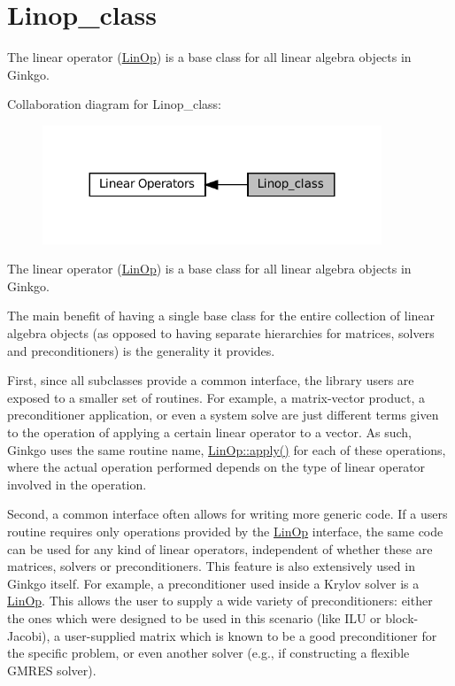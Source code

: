 \hypertarget{group__linop__class}{}\section{Linop\+\_\+class}
\label{group__linop__class}


The linear operator (\hyperlink{classgko_1_1LinOp}{Lin\+Op}) is a base class for all linear algebra objects in Ginkgo.  


Collaboration diagram for Linop\+\_\+class\+:
\nopagebreak
\begin{figure}[H]
\begin{center}
\leavevmode
\includegraphics[width=287pt]{group__linop__class}
\end{center}
\end{figure}
The linear operator (\hyperlink{classgko_1_1LinOp}{Lin\+Op}) is a base class for all linear algebra objects in Ginkgo. 

The main benefit of having a single base class for the entire collection of linear algebra objects (as opposed to having separate hierarchies for matrices, solvers and preconditioners) is the generality it provides.

First, since all subclasses provide a common interface, the library users are exposed to a smaller set of routines. For example, a matrix-\/vector product, a preconditioner application, or even a system solve are just different terms given to the operation of applying a certain linear operator to a vector. As such, Ginkgo uses the same routine name, \hyperlink{classgko_1_1LinOp_a0449b2fc705d2f970855af23b5e2788e}{Lin\+Op\+::apply()} for each of these operations, where the actual operation performed depends on the type of linear operator involved in the operation.

Second, a common interface often allows for writing more generic code. If a user\textquotesingle{}s routine requires only operations provided by the \hyperlink{classgko_1_1LinOp}{Lin\+Op} interface, the same code can be used for any kind of linear operators, independent of whether these are matrices, solvers or preconditioners. This feature is also extensively used in Ginkgo itself. For example, a preconditioner used inside a Krylov solver is a \hyperlink{classgko_1_1LinOp}{Lin\+Op}. This allows the user to supply a wide variety of preconditioners\+: either the ones which were designed to be used in this scenario (like I\+LU or block-\/\+Jacobi), a user-\/supplied matrix which is known to be a good preconditioner for the specific problem, or even another solver (e.\+g., if constructing a flexible G\+M\+R\+ES solver).

